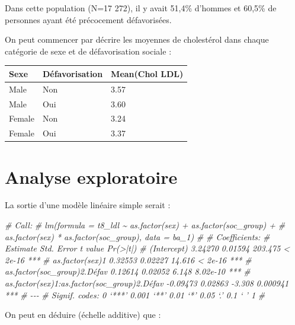 \documentclass[
]{book}
\newenvironment{Shaded}{\begin{snugshade}}{\end{snugshade}}
\newcommand{\CommentTok}[1]{\textcolor[rgb]{0.56,0.35,0.01}{\textit{#1}}}
\begin{document}
Dans cette population (N=17 272), il y avait 51,4\% d'hommes et 60,5\% de personnes ayant été précocement défavorisées.

On peut commencer par décrire les moyennes de cholestérol dans chaque catégorie de sexe et de défavorisation sociale :

\begin{table}
\centering
\begin{tabular}[t]{l|l|l}
\hline
Sexe & Défavorisation & Mean(Chol LDL)\\
\hline
Male & Non & 3.57\\
\hline
Male & Oui & 3.60\\
\hline
Female & Non & 3.24\\
\hline
Female & Oui & 3.37\\
\hline
\end{tabular}
\end{table}

\hypertarget{analyse-exploratoire}{%
\section{Analyse exploratoire}\label{analyse-exploratoire}}

La sortie d'une modèle linéaire simple serait :

\begin{Shaded}
\begin{Highlighting}[]
\CommentTok{\# Call:}
\CommentTok{\# lm(formula = t8\_ldl \textasciitilde{} as.factor(sex) + as.factor(soc\_group) + }
\CommentTok{\#     as.factor(sex) * as.factor(soc\_group), data = ba\_1)}
\CommentTok{\# }
\CommentTok{\# Coefficients:}
\CommentTok{\#                                             Estimate Std. Error t value Pr(\textgreater{}|t|)    }
\CommentTok{\# (Intercept)                                  3.24270    0.01594 203.475  \textless{} 2e{-}16 ***}
\CommentTok{\# as.factor(sex)1                              0.32553    0.02227  14.616  \textless{} 2e{-}16 ***}
\CommentTok{\# as.factor(soc\_group)2.Défav                  0.12614    0.02052   6.148 8.02e{-}10 ***}
\CommentTok{\# as.factor(sex)1:as.factor(soc\_group)2.Défav {-}0.09473    0.02863  {-}3.308 0.000941 ***}
\CommentTok{\# {-}{-}{-}}
\CommentTok{\# Signif. codes:  0 ‘***’ 0.001 ‘**’ 0.01 ‘*’ 0.05 ‘.’ 0.1 ‘ ’ 1}
\CommentTok{\# }
\end{Highlighting}
\end{Shaded}

On peut en déduire (échelle additive) que :
\end{document}
